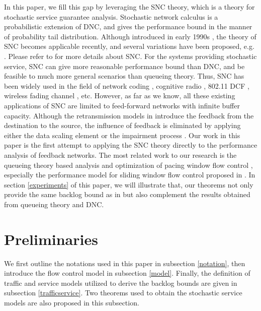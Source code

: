\documentclass[12pt]{article}
\begin{document}
In this paper, we fill this gap by leveraging the SNC theory, which is a theory for stochastic service guarantee analysis. Stochastic network calculus is a probabilistic extension of DNC, and gives the performance bound in the manner of probability tail distribution. Although introduced in early 1990s \cite{Chan94}, the theory of SNC becomes applicable recently, and several variations have been proposed, e.g. \cite{jiang2006basic,Fidl06,5984844,Ciucu2006Scaling}. Please refer to \cite{JiangLiu-15877} for more details about SNC. For the systems providing stochastic service, SNC can give more reasonable performance bound than DNC, and be feasible to much more general scenarios than queueing theory. Thus, SNC has been widely used in the field of network coding \cite{10.1109/TPDS.2010.192}, cognitive radio \cite{5466711}, 802.11 DCF \cite{xie2010network}\cite{wang2012effectiveness}, wireless fading channel \cite{Fidler2006network,wangperformance}, etc. However, as far as we know, all these existing applications of SNC are limited to feed-forward networks with infinite buffer capacity. Although the retransmission models in \cite{wangperformance,5466711} introduce the feedback from the destination to the source, the influence of feedback is eliminated by applying either the data scaling element \cite{wangperformance} or the impairment process \cite{5466711}. Our work in this paper is the first attempt to applying the SNC theory directly to the performance analysis of feedback networks. The most related work to our research is the queueing theory based analysis and optimization of pacing window flow control \cite{jung1996analysis,1095377}, especially the performance model for sliding window flow control proposed in \cite{jung1996analysis}. In section \ref{experiments} of this paper, we will illustrate that, our theorems not only provide the same backlog bound as in \cite{jung1996analysis} but also complement the results obtained from queueing theory and DNC.

\section{Preliminaries}\label{Notations}
We first outline the notations used in this paper in subsection \ref{notation}, then introduce the flow control model in subsection \ref{model}. Finally, the definition of traffic and service models utilized to derive the backlog bounds are given in subsection \ref{trafficservice}. Two theorems used to obtain the stochastic service models are also proposed in this subsection.
\end{document}
